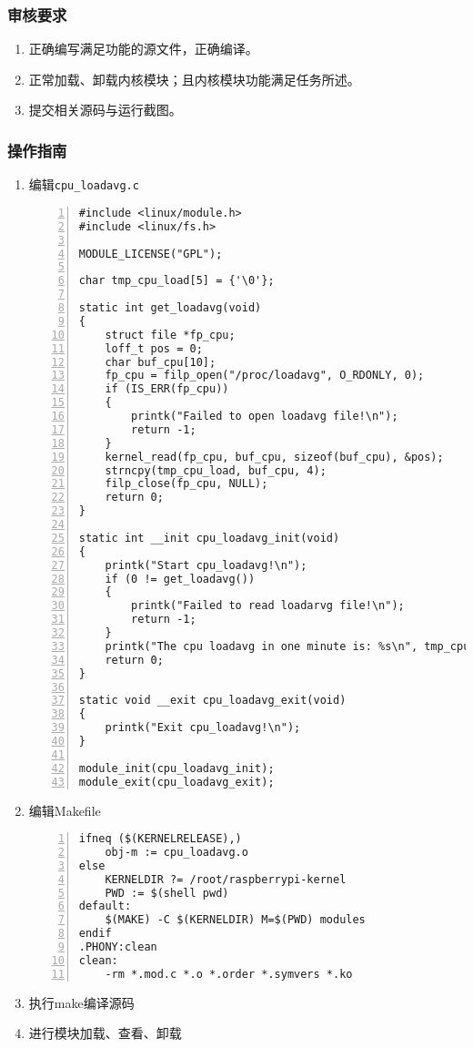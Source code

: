 \documentclass{article}
\begin{document}
\subsubsection{审核要求}
\begin{enumerate}
	\item 正确编写满足功能的源文件，正确编译。
	\item 正常加载、卸载内核模块；且内核模块功能满足任务所述。
	\item 提交相关源码与运行截图。
\end{enumerate}

\subsubsection{操作指南}
\begin{enumerate}
	\item 编辑\verb|cpu_loadavg.c|
	      \begin{lstlisting}[numbers=left]
#include <linux/module.h>
#include <linux/fs.h>

MODULE_LICENSE("GPL");

char tmp_cpu_load[5] = {'\0'};

static int get_loadavg(void)
{
	struct file *fp_cpu;
	loff_t pos = 0;
	char buf_cpu[10];
	fp_cpu = filp_open("/proc/loadavg", O_RDONLY, 0);
	if (IS_ERR(fp_cpu))
	{
		printk("Failed to open loadavg file!\n");
		return -1;
	}
	kernel_read(fp_cpu, buf_cpu, sizeof(buf_cpu), &pos);
	strncpy(tmp_cpu_load, buf_cpu, 4);
	filp_close(fp_cpu, NULL);
	return 0;
}

static int __init cpu_loadavg_init(void)
{
	printk("Start cpu_loadavg!\n");
	if (0 != get_loadavg())
	{
		printk("Failed to read loadarvg file!\n");
		return -1;
	}
	printk("The cpu loadavg in one minute is: %s\n", tmp_cpu_load);
	return 0;
}

static void __exit cpu_loadavg_exit(void)
{
	printk("Exit cpu_loadavg!\n");
}

module_init(cpu_loadavg_init);
module_exit(cpu_loadavg_exit);

\end{lstlisting}
	\item 编辑Makefile
	      \begin{lstlisting}[numbers=left]
ifneq ($(KERNELRELEASE),)
	obj-m := cpu_loadavg.o
else
	KERNELDIR ?= /root/raspberrypi-kernel
	PWD := $(shell pwd)
default:
	$(MAKE) -C $(KERNELDIR) M=$(PWD) modules
endif
.PHONY:clean
clean:
	-rm *.mod.c *.o *.order *.symvers *.ko

\end{lstlisting}
	\item 执行make编译源码
	\item 进行模块加载、查看、卸载
\end{enumerate}
\end{document}
